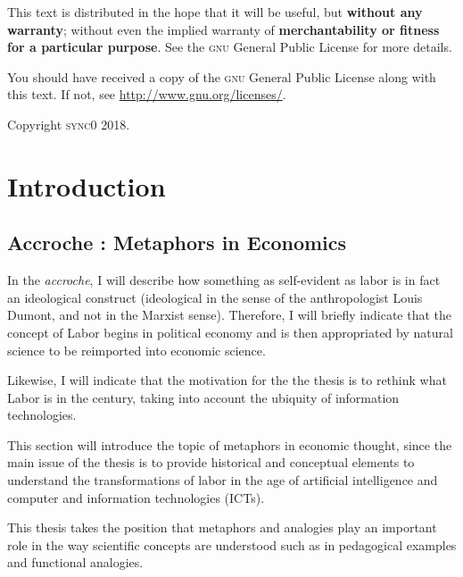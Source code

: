 \documentclass[version=last,draft=false,paper=A4,portrait,twoside=true,twocolumn=true,headinclude=false,footinclude=false,fontsize=12,BCOR=20mm,DIV=13,pagesize=auto,titlepage=firstiscover,mpinclude=false,open=right,chapterprefix=true,numbers=autoendperiod,headsepline=false,parskip=false]{scrbook}
\begin{document}
This text is distributed in the hope that it will be useful, but \textbf{without
any warranty}; without even the implied warranty of \textbf{merchantability or 
fitness for a particular purpose}. See the \textsc{gnu} General 
Public License for more details.

You should have received a copy of the \textsc{gnu} General Public License along
with this text. If not, see \url{http://www.gnu.org/licenses/}.

\vspace{1\baselineskip}
\noindent
Copyright \textcopyright \textsc{sync0} 2018. 




\newpage
\tableofcontents 
\nocite{*}

\chapter{Introduction}
\label{sec:org764ffd0}
\section{Accroche : Metaphors in Economics}
\label{sec:org778b8fe}
In the \emph{accroche}, I will describe how something as self-evident as labor is
in fact an ideological construct (ideological in the sense of the
anthropologist Louis Dumont, and not in the Marxist sense). Therefore, I
will briefly indicate that the concept of Labor begins in political economy
and is then appropriated by natural science to be reimported into economic
science.

Likewise, I will indicate that the motivation for the the thesis is to
rethink what Labor is in the  century, taking into account the ubiquity
of information technologies. 

This section will introduce the topic of metaphors in economic thought,
since the main issue of the thesis is to provide historical and conceptual
elements to understand the transformations of labor in the age of
artificial intelligence and computer and information technologies (ICTs). 

This thesis takes the position that metaphors and analogies play an
important role in the way scientific concepts are understood such as in
pedagogical examples and functional analogies. 
\end{document}
